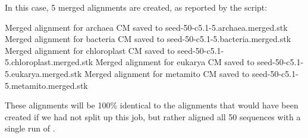 In this case, 5 merged alignments are created, as reported by the
script:

\begin{sreoutput}
Merged alignment for archaea     CM saved to seed-50-c5.1-5.archaea.merged.stk
Merged alignment for bacteria    CM saved to seed-50-c5.1-5.bacteria.merged.stk
Merged alignment for chloroplast CM saved to seed-50-c5.1-5.chloroplast.merged.stk
Merged alignment for eukarya     CM saved to seed-50-c5.1-5.eukarya.merged.stk
Merged alignment for metamito    CM saved to seed-50-c5.1-5.metamito.merged.stk
\end{sreoutput}

These alignments will be 100\% identical to the alignments that would
have been created if we had not split up this job, but rather aligned
all 50 sequences with a single run of .

